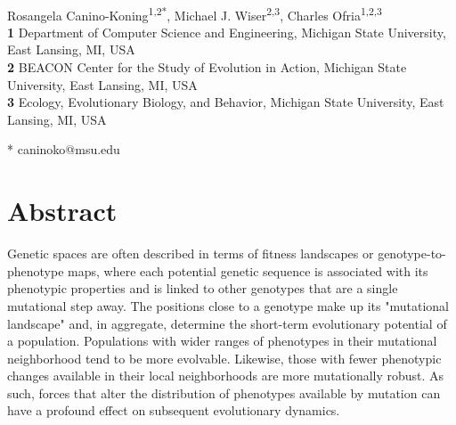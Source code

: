 \documentclass[10pt,letterpaper]{article}
\date{}
\begin{document}
\vspace*{0.2in}


\begin{flushleft}
{\Large
\textbf{} %
}
\newline
\\
Rosangela Canino-Koning\textsuperscript{1,2*},
Michael J. Wiser\textsuperscript{2,3},
Charles Ofria\textsuperscript{1,2,3}%
\\
\bigskip
\textbf{1} Department of Computer Science and Engineering, Michigan State University, East Lansing, MI, USA
\\
\textbf{2} BEACON Center for the Study of Evolution in Action, Michigan State University, East Lansing, MI, USA
\\
\textbf{3} Ecology, Evolutionary Biology, and Behavior, Michigan State University, East Lansing, MI, USA
\\
\bigskip


* caninoko@msu.edu

\end{flushleft}
\section*{Abstract}
Genetic spaces are often described in terms of fitness landscapes or genotype-to-phenotype maps, where each potential genetic sequence is associated with its phenotypic properties and is linked to other genotypes that are a single mutational step away.  The positions close to a genotype make up its "mutational landscape" and, in aggregate, determine the short-term evolutionary potential of a population.
Populations with wider ranges of phenotypes in their mutational neighborhood tend to be more evolvable. Likewise, those with fewer phenotypic changes available in their local neighborhoods are more mutationally robust. As such, forces that alter the distribution of phenotypes available by mutation can have a profound effect on subsequent evolutionary dynamics.
\end{document}
